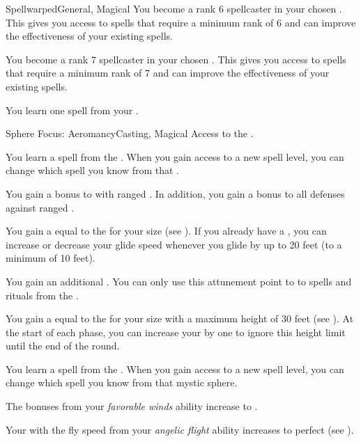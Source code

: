 \begin{feat}{Spellwarped}{General, Magical}
         You become a rank 6 spellcaster in your chosen .
        This gives you access to spells that require a minimum rank of 6 and can improve the effectiveness of your existing spells.

         You become a rank 7 spellcaster in your chosen .
        This gives you access to spells that require a minimum rank of 7 and can improve the effectiveness of your existing spells.

         You learn one spell from your .
    \end{feat}

    \begin{feat}{Sphere Focus: Aeromancy}{Casting, Magical}
        \featpre Access to the  .

         You learn a spell from the  .
        When you gain access to a new spell level, you can change which spell you know from that .

         You gain a  bonus to  with ranged .
        In addition, you gain a  bonus to all defenses against ranged .

         You gain a  equal to the  for your size (see ).
        If you already have a , you can increase or decrease your glide speed whenever you glide by up to 20 feet (to a minimum of 10 feet).

         You gain an additional .
        You can only use this attunement point to  to spells and rituals from the  .

         You gain a  equal to the  for your size with a maximum height of 30 feet (see ).
        At the start of each phase, you can increase your  by one to ignore this height limit until the end of the round.

         You learn a spell from the  .
        When you gain access to a new spell level, you can change which spell you know from that mystic sphere.

         The bonuses from your \textit{favorable winds} ability increase to .

         Your  with the fly speed from your \textit{angelic flight} ability increases to perfect (see ).
    \end{feat}

